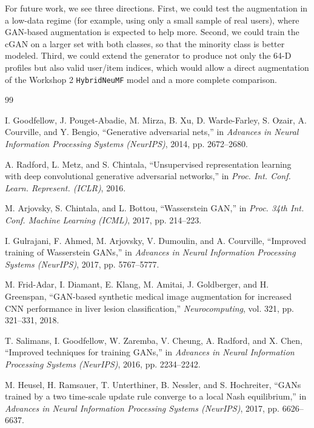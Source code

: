 \documentclass[10pt,twocolumn]{article}
\begin{document}
For future work, we see three directions. First, we could test the augmentation in a
low-data regime (for example, using only a small sample of real users), where GAN-based
augmentation is expected to help more. Second, we could train the cGAN on a larger set with both
classes, so that the minority class is better modeled. Third, we could extend the generator to
produce not only the 64-D profiles but also valid user/item indices, which would allow a direct
augmentation of the Workshop 2 \texttt{HybridNeuMF} model and a more complete comparison.

\begin{thebibliography}{99}
\small

I. Goodfellow, J. Pouget-Abadie, M. Mirza, B. Xu, D. Warde-Farley, S. Ozair, A. Courville, and
Y. Bengio, ``Generative adversarial nets,'' in \emph{Advances in Neural Information Processing
Systems (NeurIPS)}, 2014, pp. 2672--2680.

A. Radford, L. Metz, and S. Chintala, ``Unsupervised representation learning with deep
convolutional generative adversarial networks,'' in \emph{Proc. Int. Conf. Learn. Represent.
(ICLR)}, 2016.

M. Arjovsky, S. Chintala, and L. Bottou, ``Wasserstein GAN,'' in \emph{Proc. 34th Int. Conf.
Machine Learning (ICML)}, 2017, pp. 214--223.

I. Gulrajani, F. Ahmed, M. Arjovsky, V. Dumoulin, and A. Courville, ``Improved training of
Wasserstein GANs,'' in \emph{Advances in Neural Information Processing Systems (NeurIPS)}, 2017,
pp. 5767--5777.

M. Frid-Adar, I. Diamant, E. Klang, M. Amitai, J. Goldberger, and H. Greenspan, ``GAN-based
synthetic medical image augmentation for increased CNN performance in liver lesion
classification,'' \emph{Neurocomputing}, vol. 321, pp. 321--331, 2018.

T. Salimans, I. Goodfellow, W. Zaremba, V. Cheung, A. Radford, and X. Chen, ``Improved
techniques for training GANs,'' in \emph{Advances in Neural Information Processing Systems
(NeurIPS)}, 2016, pp. 2234--2242.

M. Heusel, H. Ramsauer, T. Unterthiner, B. Nessler, and S. Hochreiter, ``GANs trained by a two
time-scale update rule converge to a local Nash equilibrium,'' in \emph{Advances in Neural
Information Processing Systems (NeurIPS)}, 2017, pp. 6626--6637.


\end{thebibliography}
\end{document}
